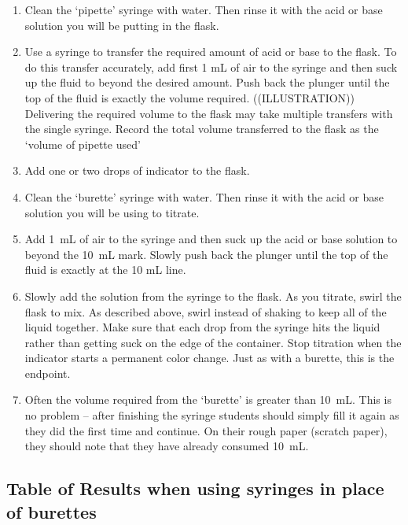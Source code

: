 \begin{enumerate}

\item{Clean the ‘pipette’ syringe with water. Then rinse it with the acid or base solution you will be putting in the flask.}

\item{Use a syringe to transfer the required amount of acid or base to the flask. To do this transfer accurately, add first 1 mL of air to the syringe and then suck up the fluid to beyond the desired amount. Push back the plunger until the top of the fluid is exactly the volume required. ((ILLUSTRATION)) Delivering the required volume to the flask may take multiple transfers with the single syringe. Record the total volume transferred to the flask as the ‘volume of pipette used’}

\item{Add one or two drops of indicator to the flask.}

\item{Clean the ‘burette’ syringe with water. Then rinse it with the acid or base solution you will be using to titrate.}

\item{Add 1~mL of air to the syringe and then suck up the acid or base solution to beyond the 10~mL mark. Slowly push back the plunger until the top of the fluid is exactly at the 10 mL line.}

\item{Slowly add the solution from the syringe to the flask. As you titrate, swirl the flask to mix. As described above, swirl instead of shaking to keep all of the liquid together. Make sure that each drop from the syringe hits the liquid rather than getting suck on the edge of the container. Stop titration when the indicator starts a permanent color change. Just as with a burette, this is the endpoint.}

\item{Often the volume required from the ‘burette’ is greater than 10~mL. This is no problem – after finishing the syringe students should simply fill it again as they did the first time and continue. On their rough paper (scratch paper), they should note that they have already consumed 10~mL.}

\end{enumerate}

\subsection{Table of Results when using syringes in place of burettes}

